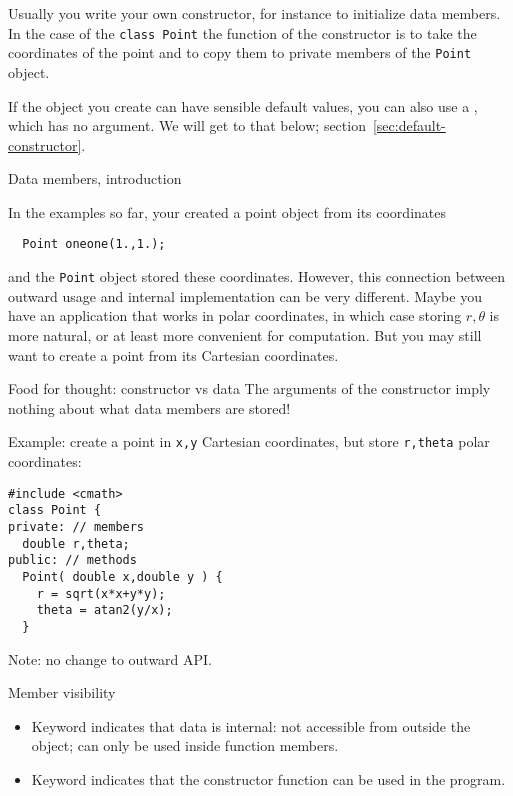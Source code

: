 Usually you write your own constructor,
for instance to initialize data members.
In the case of the \lstinline{class Point}
the function of the constructor is to take the coordinates
of the point and to copy them to private members of the \lstinline{Point} object.

If the object you create can have sensible default values,
you can also use a ,
which has no argument.
We will get to that below; section~\ref{sec:default-constructor}.

 {Data members, introduction}

In the examples so far, your created a point object from its coordinates
\begin{lstlisting}
  Point oneone(1.,1.);
\end{lstlisting}
and the \lstinline{Point} object stored these coordinates.
However, this connection between outward usage and internal implementation
can be very different.
Maybe you have an application that works in polar coordinates,
in which case storing $r,\theta$ is more natural,
or at least more convenient for computation.
But you may still want to create a point from its Cartesian coordinates.

\begin{block}{Food for thought: constructor vs data}
  \label{sl:class-set}
  The arguments of the constructor imply nothing about
  what data members are stored!

  Example: create a point in \lstinline{x,y} Cartesian coordinates,
  but store \lstinline{r,theta} polar coordinates:

  \lstset{style=snippetcode}
\begin{lstlisting}
#include <cmath>
class Point {
private: // members
  double r,theta;
public: // methods
  Point( double x,double y ) {
    r = sqrt(x*x+y*y);
    theta = atan2(y/x);
  }
\end{lstlisting}
Note: no change to outward API.
\end{block}

\begin{block}{Member visibility}
  \begin{itemize}
  \item Keyword  indicates that data is internal:
    not accessible from outside the object;
    can only be used inside function members.
  \item Keyword  indicates that the constructor
    function can be used in the program.
  \end{itemize}
\end{block}

